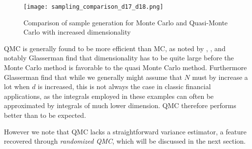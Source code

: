 \documentclass[11pt]{article}
\begin{document}
\begin{figure}[h!]
  \begin{center}
  \caption{Comparison of sample generation for Monte Carlo and Quasi-Monte Carlo with increased dimensionality} 
  \label{fig: Sampling_comparison_MC_D17D18}
  \texttt{[image: sampling\_comparison\_d17\_d18.png]}
  \end{center}
\end{figure}
QMC is generally found to be more efficient than MC, as noted by \textcite{Glasserman2004MC}, \textcite{Judd1998Book},
and notably Glasserman find that dimensionality has to be quite large before the Monte Carlo method is favorable to the quasi Monte Carlo method.
Furthermore Glasserman find that while we generally might assume that $N$ must by increase a lot when $d$ is increased, this is not
always the case in classic financial applications, as the integrals employed in these examples can often
be approximated by integrals of much lower dimension. QMC therefore performs better than to be expected.

However we note that \ac{QMC} lacks a straightforward variance estimator,
a feature recovered through \textit{randomized QMC}, which will be discussed in the next section.
\end{document}
